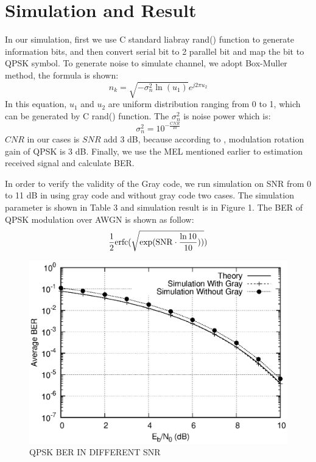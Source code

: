 \documentclass[technicalreport]{ieicej}
\begin{document}
\section{Simulation and Result}
In our simulation, first we use C standard liabray rand() function to generate information bits, and then convert serial bit to 2 parallel bit and map the bit to QPSK symbol. To generate noise to simulate channel, we adopt Box-Muller method, the formula is shown:
\begin{equation}\label{3}
n_{k}=\sqrt{-\sigma^{2}_{n}\ln (u_{1})}e^{j2\pi u_{2}}
\end{equation}
In this equation, $u_{1}$ and $u_{2}$ are uniform distribution ranging from 0 to 1, which can be generated by C rand() function. The $\sigma^2_{n}$ is noise power which is:
\begin{equation}\label{4}
\sigma^{2}_{n}=10^{-\frac{CNR}{10}}
\end{equation}
$CNR$ in our cases is $SNR$ add 3 dB, because according to \cite{inproceedings}, modulation rotation gain of QPSK is 3 dB. Finally, we use the MEL mentioned earlier to estimation received signal and calculate BER.\par
In order to verify the validity of the Gray code, we run simulation on SNR from 0 to 11 dB in using gray code and without gray code two cases. The simulation parameter is shown in Table 3 and simulation result is in Figure 1. The BER of QPSK modulation over AWGN is shown as follow:
\begin{equation}\label{5}
\frac{1}{2}\rm erfc(\sqrt{\exp (SNR\cdot \frac{\ln 10}{10}))})
\end{equation}

\begin{figure}[tbp]
	\begin{center}
		\vspace{0cm}
		\includegraphics[width=\linewidth,clip]{fig/awgn.eps}
		\caption{QPSK BER IN DIFFERENT SNR}
		\label{fig:sample}
	\end{center}
\end{figure}
\end{document}
